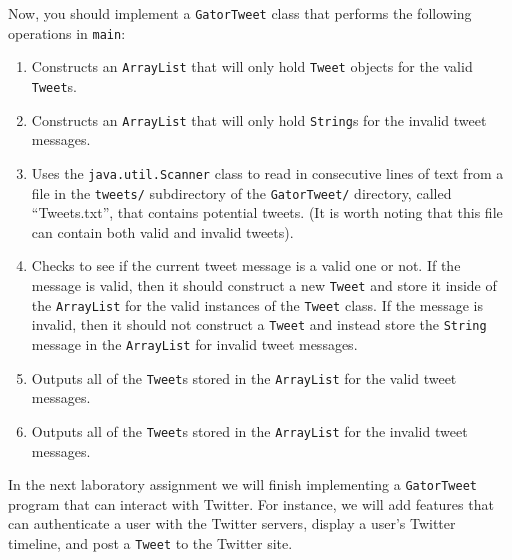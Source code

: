 
  \noindent
  Now, you should implement a {\tt GatorTweet} class that performs the following operations in {\tt main}:

\vspace*{-.1in} \begin{enumerate}
    \item Constructs an {\tt ArrayList} that will only hold {\tt Tweet} objects for the valid {\tt Tweet}s.

    \item Constructs an {\tt ArrayList} that will only hold {\tt String}s for the invalid tweet messages.

    \item Uses the {\tt java.util.Scanner} class to read in consecutive lines of text from a file in the {\tt tweets/}
      subdirectory of the {\tt GatorTweet/} directory, called ``Tweets.txt'', that contains potential tweets. (It is
      worth noting that this file can contain both valid and invalid tweets).

    \item Checks to see if the current tweet message is a valid one or not.  If the message is valid, then it should
      construct a new {\tt Tweet} and store it inside of the {\tt ArrayList} for the valid instances of the {\tt Tweet}
      class.  If the message is invalid, then it should not construct a {\tt Tweet} and instead store the {\tt String}
      message in the {\tt ArrayList} for invalid tweet messages.

    \item Outputs all of the {\tt Tweet}s stored in the {\tt ArrayList} for the valid tweet messages. 

    \item Outputs all of the {\tt Tweet}s stored in the {\tt ArrayList} for the invalid tweet messages. 

  \end{enumerate}

  In the next laboratory assignment we will finish implementing a {\tt GatorTweet} program that can interact with
  Twitter. For instance, we will add features that can authenticate a user with the Twitter servers, display a user's
  Twitter timeline, and post a {\tt Tweet} to the Twitter site.

